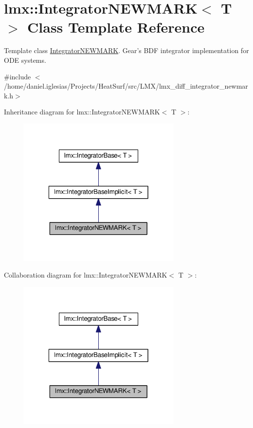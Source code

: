 \hypertarget{classlmx_1_1IntegratorNEWMARK}{\section{lmx\-:\-:Integrator\-N\-E\-W\-M\-A\-R\-K$<$ T $>$ Class Template Reference}
\label{classlmx_1_1IntegratorNEWMARK}
}


Template class \hyperlink{classlmx_1_1IntegratorNEWMARK}{Integrator\-N\-E\-W\-M\-A\-R\-K}. Gear's B\-D\-F integrator implementation for O\-D\-E systems.  




{\ttfamily \#include $<$/home/daniel.\-iglesias/\-Projects/\-Heat\-Surf/src/\-L\-M\-X/lmx\-\_\-diff\-\_\-integrator\-\_\-newmark.\-h$>$}



Inheritance diagram for lmx\-:\-:Integrator\-N\-E\-W\-M\-A\-R\-K$<$ T $>$\-:
\nopagebreak
\begin{figure}[H]
\begin{center}
\leavevmode
\includegraphics[width=232pt]{classlmx_1_1IntegratorNEWMARK__inherit__graph}
\end{center}
\end{figure}


Collaboration diagram for lmx\-:\-:Integrator\-N\-E\-W\-M\-A\-R\-K$<$ T $>$\-:
\nopagebreak
\begin{figure}[H]
\begin{center}
\leavevmode
\includegraphics[width=232pt]{classlmx_1_1IntegratorNEWMARK__coll__graph}
\end{center}
\end{figure}

